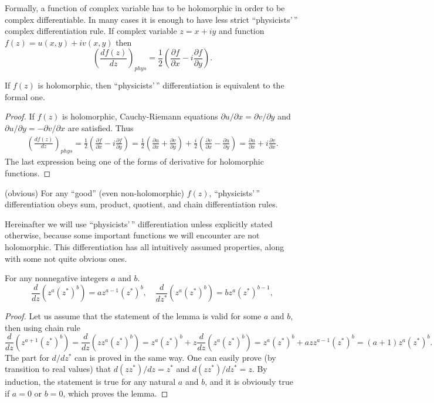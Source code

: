 Formally, a function of complex variable has to be holomorphic in order to be complex differentiable.
In many cases it is enough to have less strict ``physicists'\,'' complex differentiation rule.
If complex variable $z = x + iy$ and function $f(z) = u(x, y) + iv(x, y)$ then
\[
	\left( \frac{df(z)}{dz} \right)_{phys}
	= \frac{1}{2} \left(
		\frac{\partial f}{\partial x} - i \frac{\partial f}{\partial y}
	\right).
\]

\begin{lemma}
If $f(z)$ is holomorphic, then ``physicists'\,'' differentiation is equivalent to the formal one.
\end{lemma}
\begin{proof}
If $f(z)$ is holomorphic, Cauchy-Riemann equations $\partial u / \partial x = \partial v / \partial y$ and $\partial u / \partial y = -\partial v / \partial x$ are satisfied.
Thus
\begin{equation*}
\begin{split}
	\left( \frac{df(z)}{dz} \right)_{phys}
	= \frac{1}{2} \left(
		\frac{\partial f}{\partial x} - i \frac{\partial f}{\partial y}
	\right)
	= \frac{1}{2} \left(
		\frac{\partial u}{\partial x} + \frac{\partial v}{\partial y}
	\right)
	+ \frac{i}{2} \left(
		\frac{\partial v}{\partial x} - \frac{\partial u}{\partial y}
	\right)
	= \frac{\partial u}{\partial x} + i \frac{\partial v}{\partial x}.
\end{split}
\end{equation*}
The last expression being one of the forms of derivative for holomorphic functions.
\end{proof}

\begin{lemma}
(obvious) For any ``good'' (even non-holomorphic) $f(z)$, ``physicists'\,'' differentiation obeys sum, product, quotient, and chain differentiation rules.
\end{lemma}

Hereinafter we will use ``physicists'\,'' differentiation unless explicitly stated otherwise,
because some important functions we will encounter are not holomorphic.
This differentiation has all intuitively assumed properties, along with some not quite obvious ones.

\begin{lemma}
For any nonnegative integers $a$ and $b$.
\[
	\frac{d}{dz} (z^a (z^*)^b) = a z^{a-1} (z^*)^b,
	\quad
	\frac{d}{dz^*} (z^a (z^*)^b) = b z^a (z^*)^{b-1},
\]
\end{lemma}
\begin{proof}
Let us assume that the statement of the lemma is valid for some $a$ and $b$, then using chain rule
\[
	\frac{d}{dz} (z^{a+1} (z^*)^b)
	= \frac{d}{dz} (z z^a (z^*)^b)
	= z^a (z^*)^b + z \frac{d}{dz} (z^a (z^*)^b)
	= z^a (z^*)^b + a z z^{a-1} (z^*)^b
	= (a + 1) z^a (z^*)^b.
\]
The part for $d/dz^*$ can is proved in the same way.
One can easily prove (by transition to real values) that $d(z z^*)/dz = z^*$ and $d(z z^*)/dz^* = z$.
By induction, the statement is true for any natural $a$ and $b$,
and it is obviously true if $a = 0$ or $b = 0$, which proves the lemma.
\end{proof}

